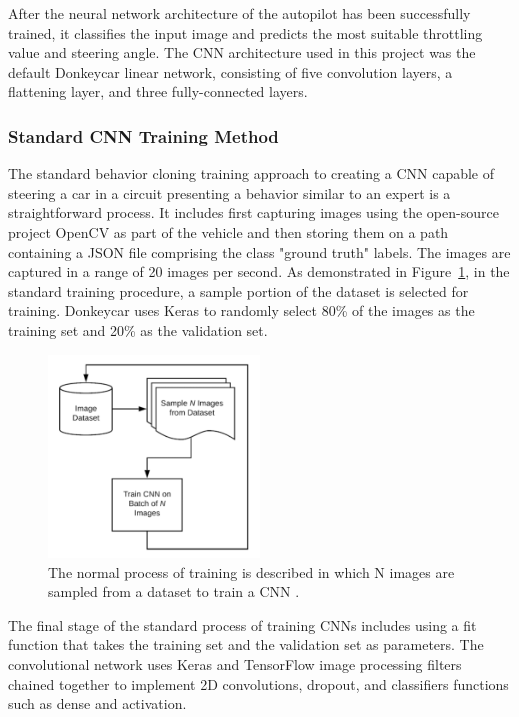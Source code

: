 \documentclass[12pt]{article}
\begin{document}
After the neural network architecture of the autopilot has been successfully trained, it classifies the input image and predicts the most suitable throttling value and steering angle. The CNN architecture used in this project was the default Donkeycar linear network, consisting of five convolution layers, a flattening layer, and three fully-connected layers.

\subsubsection{Standard CNN Training Method }

The standard behavior cloning training approach to creating a CNN capable of steering a car in a circuit presenting a behavior similar to an expert is a straightforward process. It includes first capturing images using the open-source project OpenCV as part of the vehicle and then storing them on a path containing a JSON file comprising the class "ground truth" labels. The images are captured in a range of 20 images per second. As demonstrated in  Figure~\ref{fig:standardtraining}, in the standard training procedure, a sample portion of the dataset is selected for training. Donkeycar uses Keras to randomly select 80\% of the images as the training set and 20\% as the validation set.

\begin{figure} [H] %
\begin{center}
\includegraphics[width=0.5\textwidth]{figures/standard-training.png}
\caption{ The normal process of training is described in which N images are sampled from a dataset to train a CNN \parencite{Rosebrock}.}
\label{fig:standardtraining}
\end{center}
\end{figure}

The final stage of the standard process of training CNNs includes using a fit function that takes the training set and the validation set as parameters. The convolutional network uses Keras and TensorFlow image processing filters chained together to implement 2D convolutions,  dropout, and classifiers functions such as dense and activation.
 
\end{document}

